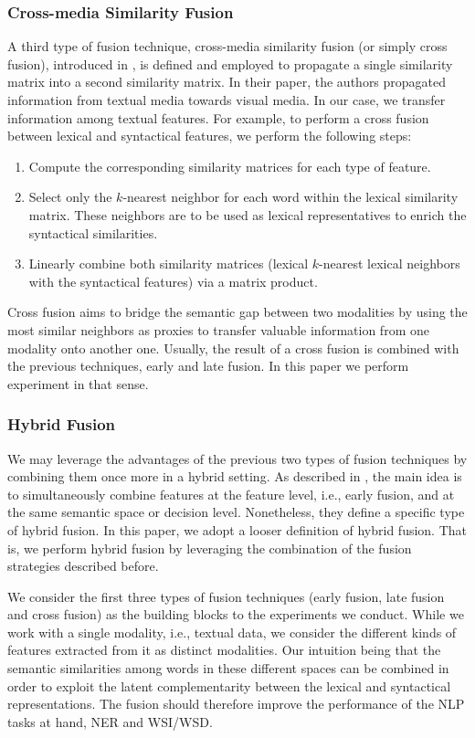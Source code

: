 \documentclass{llncs}
\begin{document}
\subsubsection{Cross-media Similarity Fusion}
%
A third type of fusion technique, cross-media similarity fusion (or simply cross fusion),   introduced in \cite{Ah-PineCC15,ClinchantAC11}, is defined and employed to propagate a single similarity matrix into a second similarity matrix. In their paper, the authors propagated information from textual media towards visual media. In our case, we transfer information among textual features. For example, to perform a cross fusion between lexical and syntactical features, we perform the following steps: 
\begin{enumerate}
\item Compute the corresponding similarity matrices for each type of feature.
\item Select only the $k$-nearest neighbor for each word within the lexical similarity matrix. These neighbors are to be used as lexical representatives to enrich the syntactical similarities.
\item Linearly combine both similarity matrices (lexical $k$-nearest lexical neighbors with the syntactical features) via a matrix product.
\end{enumerate}  

Cross fusion aims to bridge the semantic gap between two modalities by using the most similar neighbors as proxies to transfer valuable information  from one modality onto another one. Usually, the result of a cross fusion is combined with the previous techniques, early and late fusion. In this paper we perform  experiment in that sense.

\subsubsection{Hybrid Fusion}
We may leverage the advantages of the previous two types of fusion techniques by combining them once more in a hybrid setting. As described in \cite{AtreyHEK10,yu2014informedia}, the main idea is to simultaneously combine features at the feature level, i.e., early fusion, and at the same semantic space or decision level. Nonetheless, they define a specific type of hybrid fusion. In this paper, we adopt a looser definition of hybrid fusion. That is, we perform hybrid fusion by leveraging the combination of the fusion strategies described before.

We consider the first three types of fusion techniques (early fusion, late fusion and cross fusion) as the building blocks to the experiments we conduct.  While we work with a single modality, i.e., textual data, we consider the different kinds of features extracted from it as distinct modalities. Our intuition being that the semantic similarities among words in these different spaces can be combined in order to exploit the latent complementarity between the lexical and syntactical representations. The fusion should therefore improve the performance of the NLP tasks at hand, NER and WSI/WSD.
\end{document}
